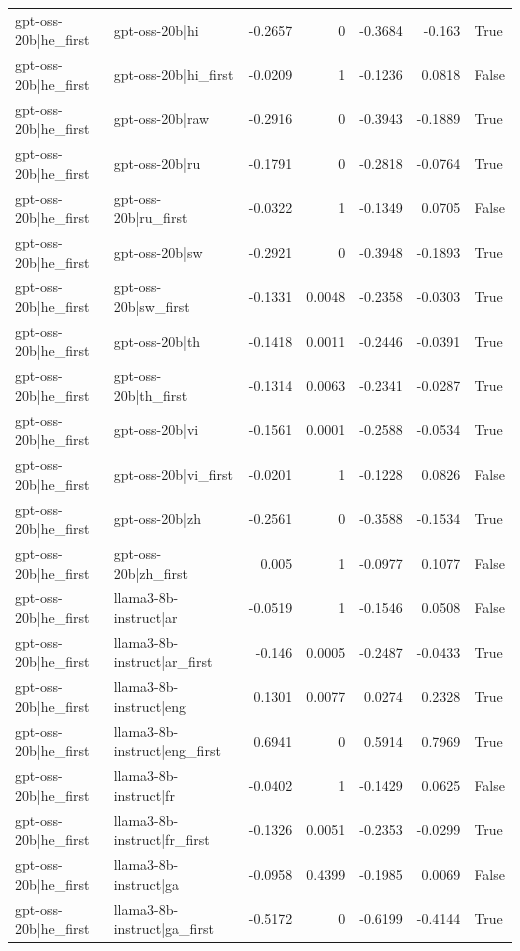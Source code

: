 \begin{table}
\begin{tabular}{l l r r r r l}
gpt-oss-20b|he_first & gpt-oss-20b|hi & -0.2657 & 0 & -0.3684 & -0.163 & True \\
gpt-oss-20b|he_first & gpt-oss-20b|hi_first & -0.0209 & 1 & -0.1236 & 0.0818 & False \\
gpt-oss-20b|he_first & gpt-oss-20b|raw & -0.2916 & 0 & -0.3943 & -0.1889 & True \\
gpt-oss-20b|he_first & gpt-oss-20b|ru & -0.1791 & 0 & -0.2818 & -0.0764 & True \\
gpt-oss-20b|he_first & gpt-oss-20b|ru_first & -0.0322 & 1 & -0.1349 & 0.0705 & False \\
gpt-oss-20b|he_first & gpt-oss-20b|sw & -0.2921 & 0 & -0.3948 & -0.1893 & True \\
gpt-oss-20b|he_first & gpt-oss-20b|sw_first & -0.1331 & 0.0048 & -0.2358 & -0.0303 & True \\
gpt-oss-20b|he_first & gpt-oss-20b|th & -0.1418 & 0.0011 & -0.2446 & -0.0391 & True \\
gpt-oss-20b|he_first & gpt-oss-20b|th_first & -0.1314 & 0.0063 & -0.2341 & -0.0287 & True \\
gpt-oss-20b|he_first & gpt-oss-20b|vi & -0.1561 & 0.0001 & -0.2588 & -0.0534 & True \\
gpt-oss-20b|he_first & gpt-oss-20b|vi_first & -0.0201 & 1 & -0.1228 & 0.0826 & False \\
gpt-oss-20b|he_first & gpt-oss-20b|zh & -0.2561 & 0 & -0.3588 & -0.1534 & True \\
gpt-oss-20b|he_first & gpt-oss-20b|zh_first & 0.005 & 1 & -0.0977 & 0.1077 & False \\
gpt-oss-20b|he_first & llama3-8b-instruct|ar & -0.0519 & 1 & -0.1546 & 0.0508 & False \\
gpt-oss-20b|he_first & llama3-8b-instruct|ar_first & -0.146 & 0.0005 & -0.2487 & -0.0433 & True \\
gpt-oss-20b|he_first & llama3-8b-instruct|eng & 0.1301 & 0.0077 & 0.0274 & 0.2328 & True \\
gpt-oss-20b|he_first & llama3-8b-instruct|eng_first & 0.6941 & 0 & 0.5914 & 0.7969 & True \\
gpt-oss-20b|he_first & llama3-8b-instruct|fr & -0.0402 & 1 & -0.1429 & 0.0625 & False \\
gpt-oss-20b|he_first & llama3-8b-instruct|fr_first & -0.1326 & 0.0051 & -0.2353 & -0.0299 & True \\
gpt-oss-20b|he_first & llama3-8b-instruct|ga & -0.0958 & 0.4399 & -0.1985 & 0.0069 & False \\
gpt-oss-20b|he_first & llama3-8b-instruct|ga_first & -0.5172 & 0 & -0.6199 & -0.4144 & True \\

\end{tabular}
\end{table}
